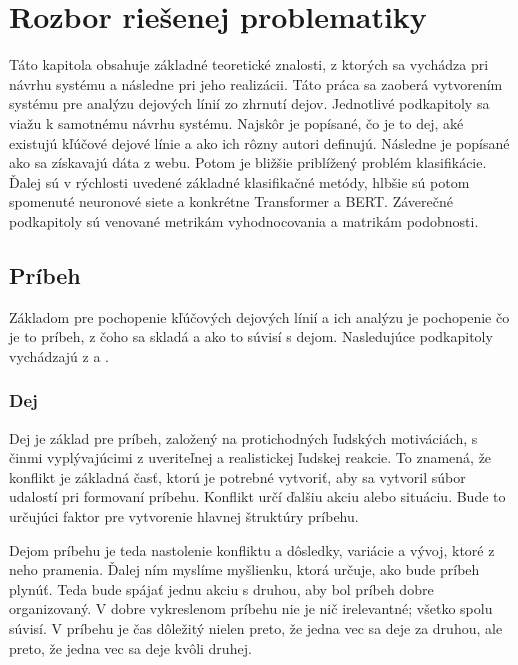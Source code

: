 \chapter{Rozbor riešenej problematiky }
\label{teoria}

Táto kapitola obsahuje základné teoretické znalosti, z ktorých sa vychádza pri návrhu systému a následne pri jeho realizácii. Táto práca sa zaoberá vytvorením systému pre analýzu dejových línií zo zhrnutí dejov. Jednotlivé podkapitoly sa viažu k samotnému návrhu systému.
Najskôr je popísané, čo je to dej, aké existujú kľúčové dejové línie a ako ich rôzny autori definujú. Následne je popísané ako sa získavajú dáta z webu. Potom je bližšie priblížený problém klasifikácie. Ďalej sú v rýchlosti uvedené základné klasifikačné metódy, hlbšie sú potom spomenuté neuronové siete a konkrétne Transformer a BERT. Záverečné podkapitoly sú venované metrikám vyhodnocovania a matrikám podobnosti.


\section{Príbeh}
Základom pre pochopenie kľúčových dejových línií a ich analýzu je pochopenie čo je to príbeh, z čoho sa skladá a ako to súvisí s dejom. Nasledujúce podkapitoly vychádzajú \linebreak
z \cite{Rosaria:2004} a \cite{Roberts:1987}.

\subsection*{Dej}

Dej je základ pre príbeh, založený na protichodných ľudských motiváciách, s činmi vyplývajúcimi z uveriteľnej a realistickej ľudskej reakcie. To znamená, že konflikt je základná časť, ktorú je potrebné vytvoriť, aby sa vytvoril súbor udalostí pri formovaní príbehu. Konflikt určí ďalšiu akciu alebo situáciu. Bude to určujúci faktor pre vytvorenie hlavnej štruktúry príbehu.
 
Dejom príbehu je teda nastolenie konfliktu a dôsledky, variácie a vývoj, ktoré z neho pramenia. Ďalej ním myslíme myšlienku, ktorá určuje, ako bude príbeh plynúť. Teda bude spájať jednu akciu s druhou, aby bol príbeh dobre organizovaný. V dobre vykreslenom príbehu nie je nič irelevantné; všetko spolu súvisí. V príbehu je čas dôležitý nielen preto, že jedna vec sa deje za druhou, ale preto, že jedna vec sa deje kvôli druhej.

